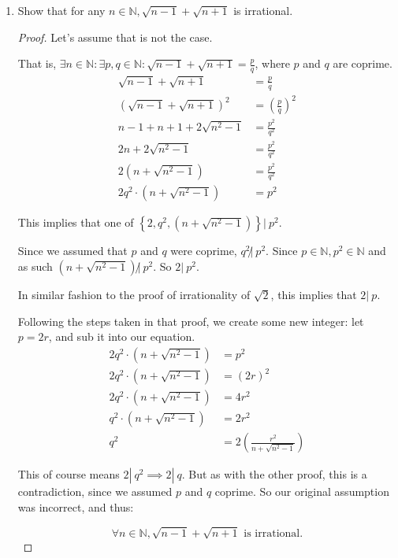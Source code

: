 \documentclass[12pt,letterpaper]{article}
\begin{document}
\begin{enumerate}
    \item Show that for any $n \in \mathbb{N}, \sqrt{n - 1} + \sqrt{n + 1}$ is irrational.

      \begin{proof}
        Let's assume that is not the case.

        That is, $\exists n \in \mathbb{N} : \exists p, q \in \mathbb{N} : \sqrt{n - 1} + \sqrt{n + 1} = \frac{p}{q}$, where $p$ and $q$ are coprime.
        \begin{align*}
          \sqrt{n - 1} + \sqrt{n + 1} &= \frac{p}{q} \\
          \left(\sqrt{n - 1} + \sqrt{n + 1}\right)^2 &= \left(\frac{p}{q}\right)^2 \\
          n - 1 + n + 1 + 2\sqrt{n^2 - 1} &= \frac{p^2}{q^2} \\
          2n + 2\sqrt{n^2 - 1} &= \frac{p^2}{q^2} \\
          2\left(n + \sqrt{n^2 - 1}\right) &= \frac{p^2}{q^2} \\
          2q^2 \cdot \left(n + \sqrt{n^2 - 1}\right) &= p^2
        \end{align*}

        This implies that one of $\left\{2, q^2, \left(n + \sqrt{n^2 - 1}\right)\right\} | \ p^2$.

        Since we assumed that $p$ and $q$ were coprime, $q^2 \not| \ p^2$.
        Since $p \in \mathbb{N}, p^2 \in \mathbb{N}$ and as such
        $\left(n + \sqrt{n^2 - 1}\right) \not| \ p^2$.
        So $2 | \ p^2$.

        In similar fashion to the proof of irrationality of $\sqrt{2}$,
        this implies that $2 | \ p$.

        Following the steps taken in that proof, we create some new integer:
        let $p = 2r$, and sub it into our equation.
        \begin{align*}
          2q^2 \cdot \left(n + \sqrt{n^2 - 1}\right) &= p^2 \\
          2q^2 \cdot \left(n + \sqrt{n^2 - 1}\right) &= (2r)^2 \\
          2q^2 \cdot \left(n + \sqrt{n^2 - 1}\right) &= 4r^2 \\
          q^2 \cdot \left(n + \sqrt{n^2 - 1}\right) &= 2r^2 \\
          q^2 &= 2\left(\frac{r^2}{n + \sqrt{n^2 - 1}}\right)
        \end{align*}

        This of course means $2 | \ q^2 \implies 2 | \ q$.
        But as with the other proof, this is a contradiction, since we assumed $p$ and $q$ coprime.
        So our original assumption was incorrect, and thus:

        \[\forall n \in \mathbb{N}, \sqrt{n - 1} + \sqrt{n + 1} \text{ is irrational.}\]

      \end{proof}
  \end{enumerate}
\end{document}
